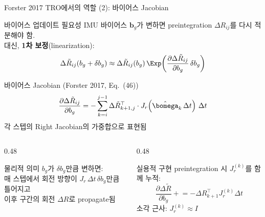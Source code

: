 \begin{frame}[shrink=8]{Forster 2017 TRO에서의 역할 (2): 바이어스 Jacobian}
  \begin{block}{바이어스 업데이트 필요성}
    IMU 바이어스 $\bm{b}_g$가 변하면 preintegration $\Delta R_{ij}$를 다시 적분해야 함.\\
    대신, \textbf{1차 보정}(linearization):
    \[
      \Delta\tilde{R}_{ij}(b_g + \delta b_g) \approx \Delta\tilde{R}_{ij}(b_g)\,\Exp\!\left(\frac{\partial\Delta\tilde{R}_{ij}}{\partial b_g}\,\delta b_g\right)
    \]
  \end{block}
  \pause
  \begin{alertblock}{바이어스 Jacobian (Forster 2017, Eq.~(46))}
    \[
      \frac{\partial\Delta\tilde{R}_{ij}}{\partial b_g}
      = -\sum_{k=i}^{j-1} \Delta\tilde{R}_{k+1,j}^\top \cdot J_r\!\left(\hat{\bomega}_k\,\Delta t\right)\,\Delta t
    \]
    각 스텝의 Right Jacobian의 가중합으로 표현됨
  \end{alertblock}
  \pause
  \begin{columns}[T]
    \begin{column}{0.48\textwidth}
      \begin{block}{물리적 의미}
        $b_g$가 $\delta b_g$만큼 변하면:\\
        매 스텝에서 회전 방향이 $J_r\,\Delta t\,\delta b_g$만큼 틀어지고\\
        이후 구간의 회전 $\Delta R$로 propagate됨
      \end{block}
    \end{column}
    \begin{column}{0.48\textwidth}
      \begin{exampleblock}{실용적 구현}
        preintegration 시 $J_r^{(k)}$를 함께 누적:\\
        \[
          \frac{\partial\Delta\tilde{R}}{\partial b_g} \mathrel{+}= -\Delta R_{k+1}^\top J_r^{(k)}\Delta t
        \]
        소각 근사: $J_r^{(k)} \approx I$
      \end{exampleblock}
    \end{column}
  \end{columns}
\end{frame}


